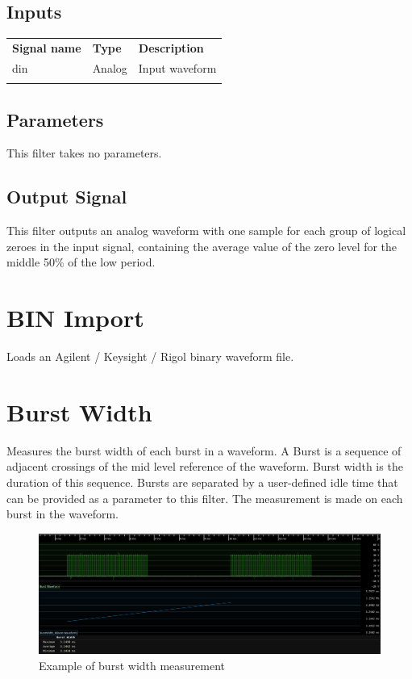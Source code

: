\subsection{Inputs}

\begin{tabularx}{16cm}{llX}
\thickhline
\textbf{Signal name} & \textbf{Type} & \textbf{Description} \\
\thickhline
din & Analog & Input waveform \\
\thickhline
\end{tabularx}

\subsection{Parameters}

This filter takes no parameters.

\subsection{Output Signal}

This filter outputs an analog waveform with one sample for each group of logical zeroes in the input signal, containing
the average value of the zero level for the middle 50\% of the low period.

\pagebreak
\section{BIN Import}

Loads an Agilent / Keysight / Rigol binary waveform file.

\pagebreak
\section{Burst Width}

Measures the burst width of each burst in a waveform. A Burst is a sequence of adjacent crossings of the mid level reference
of the waveform. Burst width is the duration of this sequence. Bursts are separated by a user-defined idle time that can be
provided as a parameter to this filter. The measurement is made on each burst in the waveform.

\begin{figure}[h]
	\centering
	\includegraphics[width=16cm]{images/filters/burst-width.png}
	\caption{Example of burst width measurement}
	\label{filter_burstwidth}
	\end{figure}

